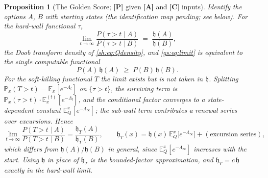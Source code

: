 \documentclass[11pt]{article}
\numberwithin{equation}{section}
\theoremstyle{plain}
\newtheorem{proposition}[theorem]{Proposition}
\theoremstyle{definition}
\theoremstyle{remark}
\newcommand{\E}{\mathbb{E}}
\newcommand{\PP}{\mathbb{P}}
\newcommand{\hm}{\mathfrak{h}}
\begin{document}
\begin{proposition}[The Golden Score; \textbf{[P]} given \textbf{[A]} and \textbf{[C]} inputs]\label{gs:prop:score}
Identify the options $A$, $B$ with starting states (the identification map pending; see below). For the hard-wall functional $\tau$,
\begin{equation}\label{gs:eq:harmonic}
    \lim_{t \to \infty} \frac{P(\tau > t \mid A)}{P(\tau > t \mid B)} \;=\; \frac{\hm(A)}{\hm(B)},
\end{equation}
the Doob transform density of \eqref{sh:eq:Qdensity}, and \eqref{gs:eq:limit} is equivalent to the single computable functional
\begin{equation}\label{gs:eq:functional}
    P(A)\,\hm(A) \;\ge\; P(B)\,\hm(B).
\end{equation}
For the soft-killing functional $T$ the limit exists but is \emph{not} taken in $\hm$. Splitting $\PP_x(T>t)=\E_x[e^{-\Lambda_t}]$ on $\{\tau>t\}$, the surviving term is $\PP_x(\tau>t)\cdot\E^{(t)}_x[e^{-\Lambda_t}]$, and the conditional factor converges to a \emph{state-dependent} constant $\E^x_Q[e^{-\Lambda_\infty}]$; the sub-wall term contributes a renewal series over excursions. Hence
\begin{equation}\label{gs:eq:hT}
\lim_{t\to\infty}\frac{P(T>t\mid A)}{P(T>t\mid B)}=\frac{\hm_T(A)}{\hm_T(B)},
\qquad
\hm_T(x)=\hm(x)\,\E^x_Q\bigl[e^{-\Lambda_\infty}\bigr]+(\text{excursion series}),
\end{equation}
which differs from $\hm(A)/\hm(B)$ in general, since $\E^x_Q[e^{-\Lambda_\infty}]$ increases with the start. Using $\hm$ in place of $\hm_T$ is the bounded-factor approximation, and $\hm_T=c\,\hm$ exactly in the hard-wall limit.
\end{proposition}
\end{document}
